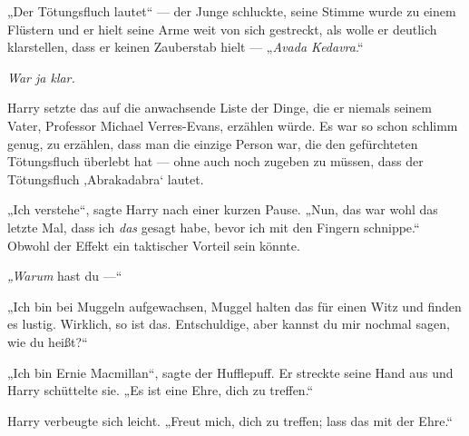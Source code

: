 „Der Tötungsfluch lautet“ — der Junge schluckte, seine Stimme wurde zu einem Flüstern und er hielt seine Arme weit von sich gestreckt, als wolle er deutlich klarstellen, dass er keinen Zauberstab hielt —
„\emph{Avada Kedavra}.“

\emph{War ja klar.}

Harry setzte das auf die anwachsende Liste der Dinge, die er niemals seinem Vater, Professor Michael Verres-Evans, erzählen würde. Es war so schon schlimm genug, zu erzählen, dass man die einzige Person war, die den gefürchteten Tötungsfluch überlebt hat — ohne auch noch zugeben zu müssen, dass der Tötungsfluch ‚Abrakadabra‘ lautet.

„Ich verstehe“, sagte Harry nach einer kurzen Pause.
„Nun, das war wohl das letzte Mal, dass ich \emph{das} gesagt habe, bevor ich mit den Fingern schnippe.“ Obwohl der Effekt ein taktischer Vorteil sein könnte.

\emph{„Warum} hast du —“

„Ich bin bei Muggeln aufgewachsen, Muggel halten das für einen Witz und finden es lustig. Wirklich, so ist das. Entschuldige, aber kannst du mir nochmal sagen, wie du heißt?“

„Ich bin Ernie Macmillan“, sagte der Hufflepuff. Er streckte seine Hand aus und Harry schüttelte sie.
„Es ist eine Ehre, dich zu treffen.“

Harry verbeugte sich leicht.
„Freut mich, dich zu treffen; lass das mit der Ehre.“

